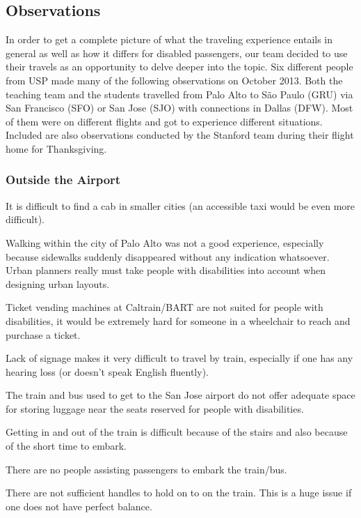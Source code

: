 \documentclass[a4paper, 12pt,conference]{new_cit_thesis}
\begin{document}
\subsection{Observations}
In order to get a complete picture of what the traveling experience entails in general as well as how it differs for disabled passengers, our team decided to use their travels as an opportunity to delve deeper into the topic. Six different people from USP made many of the following observations on October 2013. Both the teaching team and the students travelled from Palo Alto to São Paulo (GRU) via San Francisco (SFO) or San Jose (SJO) with connections in Dallas (DFW). Most of them were on different flights and got to experience different situations. Included are also observations conducted by the Stanford team during their flight home for Thanksgiving.

\subsubsection{Outside the Airport}
\begin{list}{-}{}
  \item It is difficult to find a cab in smaller cities (an accessible taxi would be even more difficult).
  \item Walking within the city of Palo Alto was not a good experience, especially because sidewalks suddenly disappeared without any indication whatsoever. Urban planners really must take people with disabilities into account when designing urban layouts.
  \item Ticket vending machines at Caltrain/BART are not suited for people with disabilities, it would be extremely hard for someone in a wheelchair to reach and purchase a ticket.
  \item Lack of signage makes it very difficult to travel by train, especially if one has any hearing loss (or doesn’t speak English fluently).
  \item The train and bus used to get to the San Jose airport do not offer adequate space for storing luggage near the seats reserved for people with disabilities.
  \item Getting in and out of the train is difficult because of the stairs and also because of the short time to embark.
  \item There are no people assisting passengers to embark the train/bus.
  \item There are not sufficient handles to hold on to on the train. This is a huge issue if one does not have perfect balance. 
\end{list}
\end{document}
